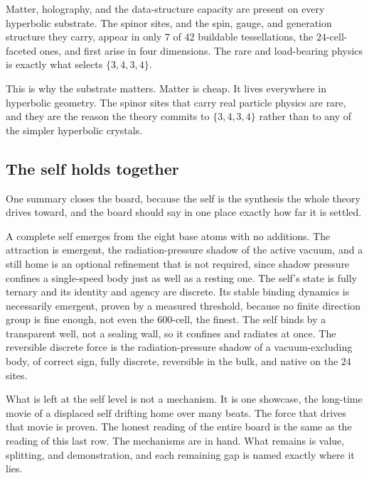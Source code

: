 \begin{result}
Matter, holography, and the data-structure capacity are present on every hyperbolic substrate. The spinor sites, and the spin, gauge, and generation structure they carry, appear in only $7$ of $42$ buildable tessellations, the $24$-cell-faceted ones, and first arise in four dimensions. The rare and load-bearing physics is exactly what selects $\{3,4,3,4\}$.
\end{result}

This is why the substrate matters. Matter is cheap. It lives everywhere in hyperbolic geometry. The spinor sites that carry real particle physics are rare, and they are the reason the theory commits to $\{3,4,3,4\}$ rather than to any of the simpler hyperbolic crystals.

\subsection{The self holds together}

One summary closes the board, because the self is the synthesis the whole theory drives toward, and the board should say in one place exactly how far it is settled.

\begin{principle}
A complete self emerges from the eight base atoms with no additions. The attraction is emergent, the radiation-pressure shadow of the active vacuum, and a still home is an optional refinement that is not required, since shadow pressure confines a single-speed body just as well as a resting one. The self's state is fully ternary and its identity and agency are discrete. Its stable binding dynamics is necessarily emergent, proven by a measured threshold, because no finite direction group is fine enough, not even the $600$-cell, the finest. The self binds by a transparent well, not a sealing wall, so it confines and radiates at once. The reversible discrete force is the radiation-pressure shadow of a vacuum-excluding body, of correct sign, fully discrete, reversible in the bulk, and native on the $24$ sites.
\end{principle}

What is left at the self level is not a mechanism. It is one showcase, the long-time movie of a displaced self drifting home over many beats. The force that drives that movie is proven. The honest reading of the entire board is the same as the reading of this last row. The mechanisms are in hand. What remains is value, splitting, and demonstration, and each remaining gap is named exactly where it lies.
